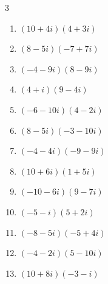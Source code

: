 \begin{multicols}{3}
\begin{enumerate}
  \item $\displaystyle (10+4i)(4+3i)$

        \phantom{$\displaystyle =28+46i$}

  \item $\displaystyle (8-5i)(-7+7i)$

        \phantom{$\displaystyle =-21+91i$}

  \item $\displaystyle (-4-9i)(8-9i)$

        \phantom{$\displaystyle =-113-36i$}

  \item $\displaystyle (4+i)(9-4i)$

        \phantom{$\displaystyle =40-7i$}

  \item $\displaystyle (-6-10i)(4-2i)$

        \phantom{$\displaystyle =-44-28i$}

  \item $\displaystyle (8-5i)(-3-10i)$

        \phantom{$\displaystyle =-74-65i$}

\columnbreak %

  \item $\displaystyle (-4-4i)(-9-9i)$

        \phantom{$\displaystyle =72i$}

  \item $\displaystyle (10+6i)(1+5i)$

        \phantom{$\displaystyle =-20+56i$}

  \item $\displaystyle (-10-6i)(9-7i)$

        \phantom{$\displaystyle =-132+16i$}

  \item $\displaystyle (-5-i)(5+2i)$

        \phantom{$\displaystyle =-23-15i$}

  \item $\displaystyle (-8-5i)(-5+4i)$

        \phantom{$\displaystyle =60-7i$}

  \item $\displaystyle (-4-2i)(5-10i)$

        \phantom{$\displaystyle =-40+30i$}

  \item $\displaystyle (10+8i)(-3-i)$


\end{enumerate}
\end{multicols}
